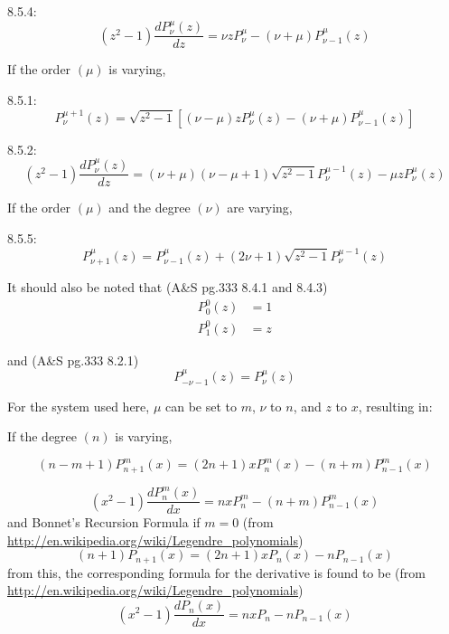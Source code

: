 \documentclass{revtex4-1}
\begin{document}
8.5.4:
\begin{equation}
(z^{2}-1) \frac{dP^{\mu}_{\nu}(z)}{dz}=\nu z P^{\mu}_{\nu}-(\nu+\mu)P^{\mu}_{\nu-1}(z)
\end{equation}

If the order $(\mu)$ is varying,

8.5.1:
\begin{equation}
P^{\mu+1}_{\nu}(z) = \sqrt{z^{2}-1} [(\nu-\mu)zP^{\mu}_{\nu}(z)-(\nu+\mu)P^{\mu}_{\nu-1}(z)]
\end{equation}

8.5.2:
\begin{equation}
(z^{2}-1)\frac{dP^{\mu}_{\nu}(z)}{dz}=(\nu+\mu)(\nu-\mu+1)\sqrt{z^{2}-1}P^{\mu-1}_{\nu}(z)-\mu z P^{\mu}_{\nu}(z)
\end{equation}

If the order $(\mu)$ and the degree $(\nu)$ are varying,

8.5.5:
\begin{equation}
P^{\mu}_{\nu+1}(z)=P^{\mu}_{\nu-1}(z)+(2\nu+1)\sqrt{z^{2}-1}P^{\mu-1}_{\nu}(z)
\end{equation}

It should also be noted that (A\&S pg.333 8.4.1 and 8.4.3)
\begin{align}
P^{0}_{0}(z) &= 1\\
P^{0}_{1}(z) &= z
\end{align}

and (A\&S pg.333 8.2.1)
\begin{equation}
P^{\mu}_{-\nu-1}(z)=P^{\mu}_{\nu}(z)
\end{equation}

For the system used here, $\mu$ can be set to $m$, $\nu$ to $n$, and $z$ to $x$, resulting in: 

If the degree $(n)$ is varying,

\begin{equation}
\left( n - m +1 \right)P^{m}_{n+1}\left( x \right) = (2n+1)xP^{m}_{n}(x)-(n+m)P^{m}_{n-1}(x)
\end{equation}

\begin{equation}
(x^{2}-1) \frac{dP^{m}_{n}(x)}{dx}=n x P^{m}_{n}-(n+m)P^{m}_{n-1}(x)
\end{equation}
and Bonnet's Recursion Formula if $m=0$ (from \url{http://en.wikipedia.org/wiki/Legendre_polynomials})
\begin{equation}
\left( n +1 \right)P_{n+1}\left( x \right) = (2n+1)xP_{n}(x)-nP_{n-1}(x)
\end{equation}
from this, the corresponding formula for the derivative is found to be (from \url{http://en.wikipedia.org/wiki/Legendre_polynomials})
\begin{equation}
(x^{2}-1) \frac{dP_{n}(x)}{dx}=n x P_{n}-nP_{n-1}(x)
\end{equation}
\end{document}
